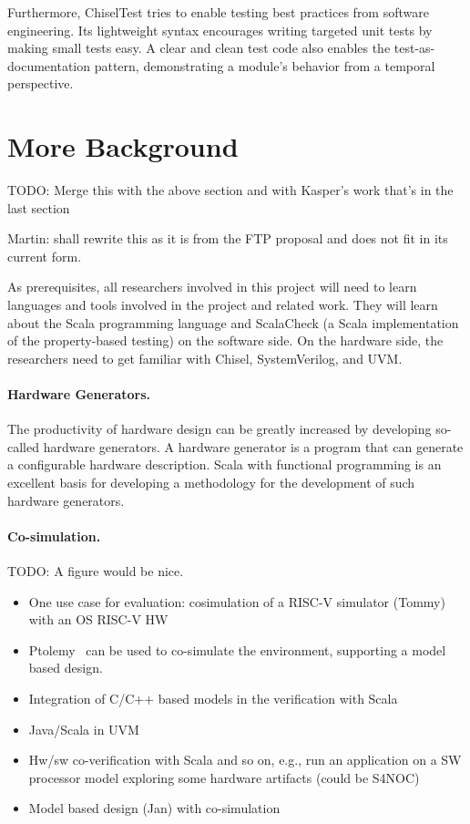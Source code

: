 \documentclass[conference]{IEEEtran}
\newcommand{\todo}[1]{{\color{olive} TODO: #1}}
\newcommand{\martin}[1]{{\color{blue} Martin: #1}}
\begin{document}
Furthermore, ChiselTest tries to enable testing best practices from software engineering.
Its lightweight syntax encourages writing targeted unit tests by making small tests easy.
A clear and clean test code also enables the test-as-documentation pattern,
demonstrating a module's behavior from a temporal perspective.

\section{More Background} 

\todo{Merge this with the above section and with Kasper's work that's in the last section}

\martin{shall rewrite this as it is from the FTP proposal and does not
fit in its current form.}


As prerequisites, all researchers involved in this project will need to learn
languages and tools involved in the project and related work.
They will learn about the Scala programming language and ScalaCheck
(a Scala implementation of the property-based testing) on the software side.
On the hardware side,
the researchers need to get familiar with Chisel, SystemVerilog, and
UVM.


\paragraph{Hardware Generators.}

The productivity of hardware design can be greatly increased by developing so-called
hardware generators. A hardware generator is a program that can generate a configurable
hardware description.
Scala with functional programming is an excellent basis for developing a methodology for the
development of such hardware generators.



\paragraph{Co-simulation.}

\todo{A figure would be nice.}

\begin{itemize}
\item One use case for evaluation: cosimulation of a RISC-V simulator (Tommy) with an OS RISC-V HW 
\item Ptolemy~\cite{ptolemyII-book} can be used to co-simulate the environment, supporting a model based design.
\item Integration of C/C++ based models in the verification with Scala
\item Java/Scala in UVM
\item Hw/sw co-verification with Scala and so on, e.g., run an application on a SW processor model exploring some hardware artifacts (could be S4NOC)
\item Model based design (Jan) with co-simulation
\end{itemize}
\end{document}
